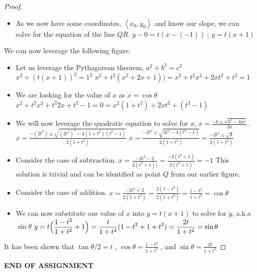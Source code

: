 \documentclass[10pt]{article}
\theoremstyle{plain}
\begin{document}
\begin{proof}
\begin{itemize}
    \item As we now have some coordinates, $\left< x_{0},y_{0} \right>$ and know our slope, we can solve for the equation of the line $QR$.
    \subitem $y-0 = t(x-(-1)) \ ; \ y = t(x+1)$
  \end{itemize}
  We can now leverage the following figure.
  \begin{center}
  \end{center}
  \begin{itemize}
    \item Let us leverage the Pythagorean theorem, $a^{2}+b^{2}=c^{2}$
    \subitem $x^{2}+(t(x+1))^{2}=1^{2}$
    \subitem $x^{2}+t^{2}(x^{2}+2x+1))=x^{2}+t^{2}x^{2}+2xt^{2}+t^{2}=1$
    \item We are looking for the value of $x$ as $x=\cos{\theta}$
    \subitem $x^{2}+t^{2}x^{2}+t^{2}2x+t^{2}-1=0=x^{2}(1+t^{2})+2xt^{2}+(t^{2}-1)$
    \item We will now leverage the quadratic equation to solve for $x$, $\displaystyle x=\frac{-b\pm\sqrt{b^{2}-4ac}}{2a}$.
    \subitem $\displaystyle x=\frac{-(2t^{2})\pm\sqrt{(2t^{2})^{2}-4(1+t^{2})(t^{2}-1)}}{2(1+t^{2})}$
    \subitem $\displaystyle x=\frac{-2t^{2}\pm\sqrt{4t^{4}-4(t^{4}-1)}}{2(1+t^{2})}=\frac{-2t^{2}\pm\sqrt{4}}{2(1+t^{2})}$
    \item Consider the case of subtraction.
    \subitem $\displaystyle x=\frac{-2t^{2}-2}{2(t^{2}+1))}=\frac{-2(t^{2}+1)}{2(t^{2}+1)}=-1$
    \subitem This solution is trivial and can be identified as point $Q$ from our earlier figure.
    \item Consider the case of addition.
    \subitem $\displaystyle x=\frac{-2t^{2}+2}{2(1+t^{2})}=\frac{2(1-t^{2})}{2(1+t^{2})}=\frac{1-t^{2}}{1+t^{2}}=\cos{\theta}$
    \item We can now substitute our value of $x$ into $y=t(x+1)$ to solve for $y$, a.k.a $\sin{\theta}$
    \subitem $\displaystyle y=t\Bigl(\frac{1-t^{2}}{1+t^{2}}+1\Bigr)=\frac{t}{1+t^{2}}(1-t^{2}+1+t^{2})=\frac{2t}{1+t^{2}}=\sin{\theta}$
  \end{itemize}
  It has been shown that $\displaystyle \tan{\theta/2}=t$ , $\displaystyle \cos{\theta}=\frac{1-t^{2}}{1+t^{2}}$ , and $\displaystyle \sin{\theta}=\frac{2t}{1+t^{2}}$
\end{proof}

\hrulefill

\begin{center}
  \textbf{END OF ASSIGNMENT}
\end{center}
\end{document}
